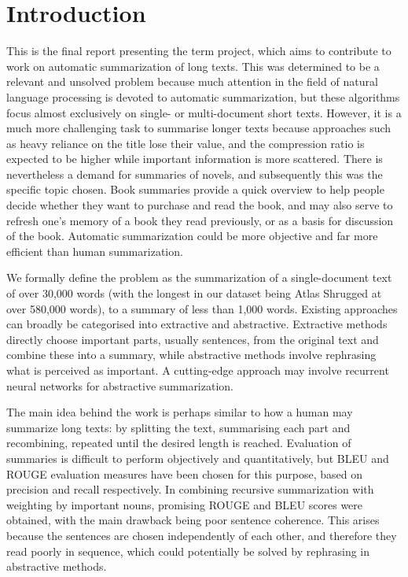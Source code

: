 \section{Introduction}
This is the final report presenting the term project, which aims to contribute to work on automatic summarization of long texts. This was determined to be a relevant and unsolved problem because much attention in the field of natural language processing is devoted to automatic summarization, but these algorithms focus almost exclusively on single- or multi-document short texts. However, it is a much more challenging task to summarise longer texts because approaches such as heavy reliance on the title lose their value, and the compression ratio is expected to be higher while important information is more scattered. There is nevertheless a demand for summaries of novels, and subsequently this was the specific topic chosen. Book summaries provide a quick overview to help people decide whether they want to purchase and read the book, and may also serve to refresh one's memory of a book they read previously, or as a basis for discussion of the book. Automatic summarization could be more objective and far more efficient than human summarization.

We formally define the problem as the summarization of a single-document text of over 30,000 words (with the longest in our dataset being Atlas Shrugged at over 580,000 words), to a summary of less than 1,000 words. Existing approaches can broadly be categorised into extractive and abstractive. Extractive methods directly choose important parts, usually sentences, from the original text and combine these into a summary, while abstractive methods involve rephrasing what is perceived as important. A cutting-edge approach may involve recurrent neural networks for abstractive summarization.

The main idea behind the work is perhaps similar to how a human may summarize long texts: by splitting the text, summarising each part and recombining, repeated until the desired length is reached. Evaluation of summaries is difficult to perform objectively and quantitatively, but BLEU and ROUGE evaluation measures have been chosen for this purpose, based on precision and recall respectively. In combining recursive summarization with weighting by important nouns, promising ROUGE and BLEU scores were obtained, with the main drawback being poor sentence coherence. This arises because the sentences are chosen independently of each other, and therefore they read poorly in sequence, which could potentially be solved by rephrasing in abstractive methods.

